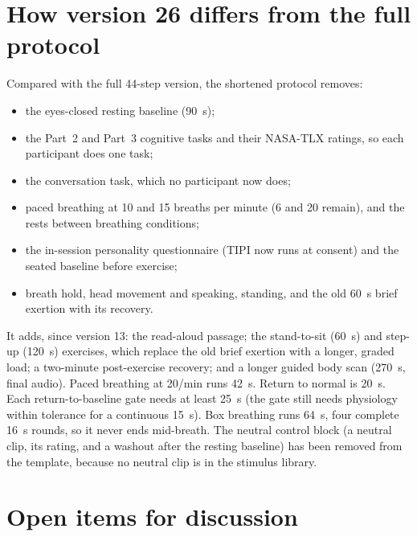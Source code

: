 \documentclass[11pt,a4paper]{article}
\begin{document}
\section{How version 26 differs from the full protocol}

Compared with the full 44-step version, the shortened protocol removes:

\begin{itemize}
  \item the eyes-closed resting baseline (90~s);
  \item the Part~2 and Part~3 cognitive tasks and their NASA-TLX ratings, so each participant does one task;
  \item the conversation task, which no participant now does;
  \item paced breathing at 10 and 15 breaths per minute (6 and 20 remain), and the rests between breathing conditions;
  \item the in-session personality questionnaire (TIPI now runs at consent) and the seated baseline before exercise;
  \item breath hold, head movement and speaking, standing, and the old 60~s brief exertion with its recovery.
\end{itemize}

It adds, since version 13: the read-aloud passage; the
stand-to-sit (60~s) and step-up (120~s) exercises, which replace the old brief exertion with a longer, graded load;
a two-minute post-exercise recovery; and a longer guided body scan
(270~s, final audio). Paced breathing at 20/min runs 42~s. Return to normal is 20~s. Each return-to-baseline gate needs at least 25~s (the gate still
needs physiology within tolerance for a continuous 15~s). Box breathing runs 64~s, four complete 16~s rounds, so it
never ends mid-breath. The neutral control block (a neutral clip, its rating, and a washout after the resting
baseline) has been removed from the template, because no neutral clip is in the stimulus library.

\section{Open items for discussion}\label{sec:open}
\end{document}
